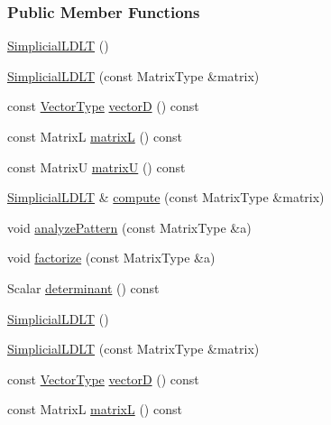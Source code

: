 \subsubsection*{Public Member Functions}
\begin{DoxyCompactItemize}
\item 
\hyperlink{group___sparse_cholesky___module_a3f26ae6105ffa36af9b8710e01e5caed}{Simplicial\+L\+D\+LT} ()
\item 
\hyperlink{group___sparse_cholesky___module_a07cb76aee396862f94c3eedc6d77d908}{Simplicial\+L\+D\+LT} (const Matrix\+Type \&matrix)
\item 
const \hyperlink{group___core___module}{Vector\+Type} \hyperlink{group___sparse_cholesky___module_abe54532ce80558a0474b11763702107b}{vectorD} () const
\item 
const MatrixL \hyperlink{group___sparse_cholesky___module_ae8f502eff0c95771115968510e4d9af5}{matrixL} () const
\item 
const MatrixU \hyperlink{group___sparse_cholesky___module_ae98ed1c7ce8f9165adf5fb08cbb36b70}{matrixU} () const
\item 
\hyperlink{group___sparse_cholesky___module_class_eigen_1_1_simplicial_l_d_l_t}{Simplicial\+L\+D\+LT} \& \hyperlink{group___sparse_cholesky___module_a55429e59dbdf16a5696ee28bbf14e44f}{compute} (const Matrix\+Type \&matrix)
\item 
void \hyperlink{group___sparse_cholesky___module_aaf7c852056195d05de863362638517b7}{analyze\+Pattern} (const Matrix\+Type \&a)
\item 
void \hyperlink{group___sparse_cholesky___module_a8cf16bd92a712d36310397972bdef044}{factorize} (const Matrix\+Type \&a)
\item 
Scalar \hyperlink{group___sparse_cholesky___module_aa25042f3b49880f5e487d468ea20b1b7}{determinant} () const
\item 
\hyperlink{group___sparse_cholesky___module_a3f26ae6105ffa36af9b8710e01e5caed}{Simplicial\+L\+D\+LT} ()
\item 
\hyperlink{group___sparse_cholesky___module_a07cb76aee396862f94c3eedc6d77d908}{Simplicial\+L\+D\+LT} (const Matrix\+Type \&matrix)
\item 
const \hyperlink{group___core___module}{Vector\+Type} \hyperlink{group___sparse_cholesky___module_abe54532ce80558a0474b11763702107b}{vectorD} () const
\item 
const MatrixL \hyperlink{group___sparse_cholesky___module_ae8f502eff0c95771115968510e4d9af5}{matrixL} () const
\item 

\end{DoxyCompactItemize}
